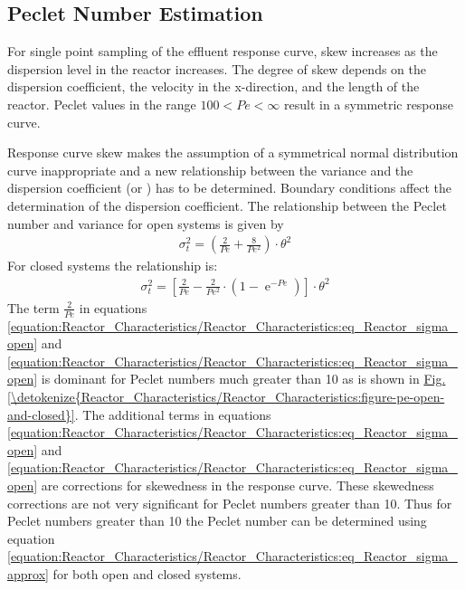 \documentclass[letterpaper,10pt,english]{sphinxmanual}
\begin{document}
\subsection{Peclet Number Estimation}
\label{\detokenize{Reactor_Characteristics/Reactor_Characteristics:peclet-number-estimation}}
For single point sampling of the effluent response curve, skew increases as the dispersion level in the reactor increases. The degree of skew depends on the dispersion coefficient, the velocity in the x-direction, and the length of the reactor. Peclet values in the range \(100\mathrm{<}Pe \mathrm{<} \mathrm{\infty}\) result in a symmetric response curve.

Response curve skew makes the assumption of a symmetrical normal distribution curve inappropriate and a new relationship between the variance and the dispersion coefficient (or ) has to be determined. Boundary conditions affect the determination of the dispersion coefficient. The relationship between the Peclet number and variance for open systems is given by
\begin{equation}\label{equation:Reactor_Characteristics/Reactor_Characteristics:eq_Reactor_sigma_open}
\begin{split}\sigma _{t}^{2} =\left(\frac{2}{Pe} +\frac{8}{Pe^{2} } \right)\cdot \theta ^{2}\end{split}
\end{equation}
For closed systems the relationship is:
\begin{equation}\label{equation:Reactor_Characteristics/Reactor_Characteristics:eq_Reactor_sigma_closed}
\begin{split}\sigma _{t}^{2} =\left[\frac{2}{Pe} -\frac{2}{Pe^{2} } \cdot \left(1-{\mathop{e}\nolimits^{-Pe}} \right)\right]\cdot \theta ^{2}\end{split}
\end{equation}
The term \(\frac{2}{Pe}\) in equations \eqref{equation:Reactor_Characteristics/Reactor_Characteristics:eq_Reactor_sigma_open} and \eqref{equation:Reactor_Characteristics/Reactor_Characteristics:eq_Reactor_sigma_open} is dominant for Peclet numbers much greater than 10 as is shown in \hyperref[\detokenize{Reactor_Characteristics/Reactor_Characteristics:figure-pe-open-and-closed}]{Fig.\@ \ref{\detokenize{Reactor_Characteristics/Reactor_Characteristics:figure-pe-open-and-closed}}}. The additional terms in equations \eqref{equation:Reactor_Characteristics/Reactor_Characteristics:eq_Reactor_sigma_open} and \eqref{equation:Reactor_Characteristics/Reactor_Characteristics:eq_Reactor_sigma_open} are corrections for skewedness in the response curve. These skewedness corrections are not very significant for Peclet numbers greater than 10. Thus for Peclet numbers greater than 10 the Peclet number can be determined using equation \eqref{equation:Reactor_Characteristics/Reactor_Characteristics:eq_Reactor_sigma_approx} for both open and closed systems.
\end{document}
